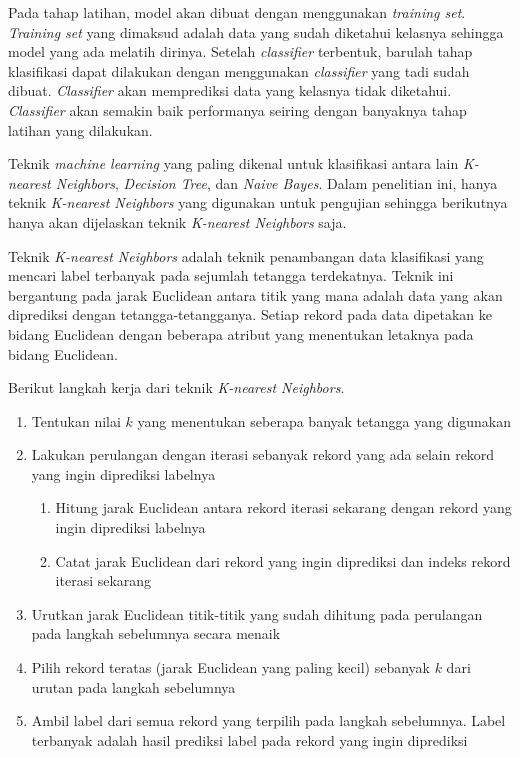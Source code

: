 \documentclass[a4paper,twoside]{article}
\begin{document}
\begin{enumerate}
\begin{enumerate}
			Pada tahap latihan, model akan dibuat dengan menggunakan \textit{training set}. \textit{Training set} yang dimaksud adalah data yang sudah diketahui kelasnya sehingga model yang ada melatih dirinya. Setelah \textit{classifier} terbentuk, barulah tahap klasifikasi dapat dilakukan dengan menggunakan \textit{classifier} yang tadi sudah dibuat. \textit{Classifier} akan memprediksi data yang kelasnya tidak diketahui. \textit{Classifier} akan semakin baik performanya seiring dengan banyaknya tahap latihan yang dilakukan.

			Teknik \textit{machine learning} yang paling dikenal untuk klasifikasi antara lain \textit{K-nearest Neighbors}, \textit{Decision Tree}, dan \textit{Naive Bayes}. Dalam penelitian ini, hanya teknik \textit{K-nearest Neighbors} yang digunakan untuk pengujian sehingga berikutnya hanya akan dijelaskan teknik \textit{K-nearest Neighbors} saja.

			Teknik \textit{K-nearest Neighbors} adalah teknik penambangan data klasifikasi yang mencari label terbanyak pada sejumlah tetangga terdekatnya. Teknik ini bergantung pada jarak Euclidean antara titik yang mana adalah data yang akan diprediksi dengan tetangga-tetangganya. Setiap rekord pada data dipetakan ke bidang Euclidean dengan beberapa atribut yang menentukan letaknya pada bidang Euclidean. 

			Berikut langkah kerja dari teknik \textit{K-nearest Neighbors}.
			\begin{enumerate}
				\item Tentukan nilai \(k\) yang menentukan seberapa banyak tetangga yang digunakan
				\item Lakukan perulangan dengan iterasi sebanyak rekord yang ada selain rekord yang ingin diprediksi labelnya
				\begin{enumerate}
					\item Hitung jarak Euclidean antara rekord iterasi sekarang dengan rekord yang ingin diprediksi labelnya
					\item Catat jarak Euclidean dari rekord yang ingin diprediksi dan indeks rekord iterasi sekarang
				\end{enumerate}
				\item Urutkan jarak Euclidean titik-titik yang sudah dihitung pada perulangan pada langkah sebelumnya secara menaik
				\item Pilih rekord teratas (jarak Euclidean yang paling kecil) sebanyak \(k\) dari urutan pada langkah sebelumnya
				\item Ambil label dari semua rekord yang terpilih pada langkah sebelumnya. Label terbanyak adalah hasil prediksi label pada rekord yang ingin diprediksi
			\end{enumerate}
			

\end{enumerate}
\end{enumerate}
\end{document}
